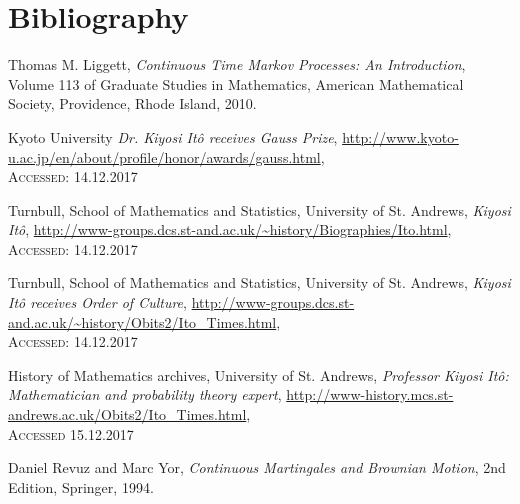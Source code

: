 \documentclass[11pt,a4paper, final]{article}
\begin{document}
\section{Bibliography}
\begin{thebibliography}{9}

  Thomas M. Liggett,
  \textit{Continuous Time Markov Processes: An Introduction},
  Volume 113 of Graduate Studies in Mathematics, American Mathematical Society,
  Providence, Rhode Island,
  2010.

	Kyoto University
	\textit{Dr. Kiyosi Itô receives Gauss Prize}, \url{http://www.kyoto-u.ac.jp/en/about/profile/honor/awards/gauss.html}, \\ \textsc{Accessed}: 14.12.2017

	Turnbull, School of Mathematics and Statistics, University of St. Andrews, \textit{Kiyosi Itô}, \url{http://www-groups.dcs.st-and.ac.uk/~history/Biographies/Ito.html}, \textsc{Accessed}: 14.12.2017

	Turnbull, School of Mathematics and Statistics, University of St. Andrews, \textit{Kiyosi Itô receives Order of Culture}, \url{http://www-groups.dcs.st-and.ac.uk/~history/Obits2/Ito_Times.html}, \\ \textsc{Accessed}: 14.12.2017

	History of Mathematics archives, University of St. Andrews, \textit{Professor Kiyosi Itô: Mathematician and probability theory expert}, \url{http://www-history.mcs.st-andrews.ac.uk/Obits2/Ito_Times.html}, \\  \textsc{Accessed} 15.12.2017

	Daniel Revuz and Marc Yor, \textit{Continuous Martingales and Brownian Motion}, 2nd Edition, Springer, 1994. 

\end{thebibliography}
\end{document}

